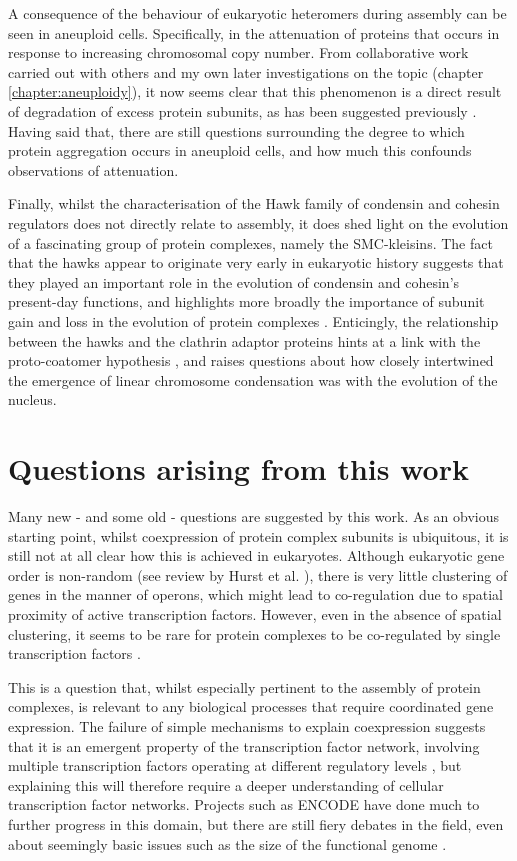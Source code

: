\documentclass[a4paper,11pt,twoside,openright]{scrbook}
\begin{document}
A consequence of the behaviour of eukaryotic heteromers during assembly can be
seen in aneuploid cells. Specifically, in the attenuation of proteins that
occurs in response to increasing chromosomal copy number. From collaborative
work carried out with others \cite{McShane2016} and my own later investigations
on the topic (chapter \ref{chapter:aneuploidy}), it now seems clear that this
phenomenon is a direct result of degradation of excess protein subunits, as has
been suggested previously \cite{Dephoure2014,Mueller2015,Goncalves2017}. Having
said that, there are still questions surrounding the degree to which protein
aggregation occurs in aneuploid cells, and how much this confounds observations
of attenuation.

Finally, whilst the characterisation of the Hawk family of condensin and cohesin
regulators does not directly relate to assembly, it does shed light on the
evolution of a fascinating group of protein complexes, namely the SMC-kleisins.
The fact that the hawks appear to originate very early in eukaryotic history
suggests that they played an important role in the evolution of condensin and
cohesin's present-day functions, and highlights more broadly the importance of
subunit gain and loss in the evolution of protein complexes
\cite{Seidl2009,Wan2015}. Enticingly, the relationship between the hawks and the
clathrin adaptor proteins hints at a link with the proto-coatomer hypothesis
\cite{Devos2006,Field2011}, and raises questions about how closely intertwined
the emergence of linear chromosome condensation was with the evolution of the
nucleus.

\section{Questions arising from this work}
Many new - and some old - questions are suggested by this work. As an obvious
starting point, whilst coexpression of protein complex subunits is ubiquitous,
it is still not at all clear how this is achieved in eukaryotes. Although
eukaryotic gene order is non-random (see review by Hurst et al.
\cite{Hurst2004}), there is very little clustering of genes in the manner of
operons, which might lead to co-regulation due to spatial proximity of active
transcription factors. However, even in the absence of spatial clustering, it
seems to be rare for protein complexes to be co-regulated by single
transcription factors \cite{Tan2007}.

This is a question that, whilst especially pertinent to the assembly of protein
complexes, is relevant to any biological processes that require coordinated gene
expression. The failure of simple mechanisms to explain coexpression suggests
that it is an emergent property of the transcription factor network, involving
multiple transcription factors operating at different regulatory levels
\cite{Tsai2007,Muhammad2017}, but explaining this will therefore require a
deeper understanding of cellular transcription factor networks. Projects such as
ENCODE have done much to further progress in this domain, but there are still
fiery debates in the field, even about seemingly basic issues such as the size
of the functional genome \cite{Neph2012,Graur2013,Graur2017}.
\end{document}
